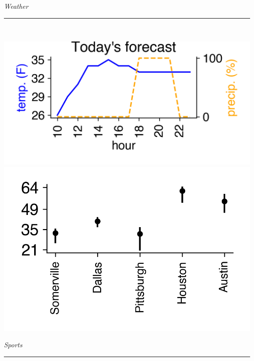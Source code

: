 \documentclass{article}
\date{\today}
\renewcommand\headline[1]{\begin{center} {\huge \textsl{ #1}}\\ %
			\rule[5pt]{0.8\hsize}{0.5pt}\\ \end{center}}
\begin{document}
\maketitle

\begin{multicols}{3}

\headline{Weather}
\center\includegraphics[width=\linewidth]{images/weather-forecast.png}
\noindent\center\includegraphics[width=0.75\linewidth]{images/weather-ranges.png}

\headline{Sports}
\lipsum[1]


\end{multicols}
\end{document}

